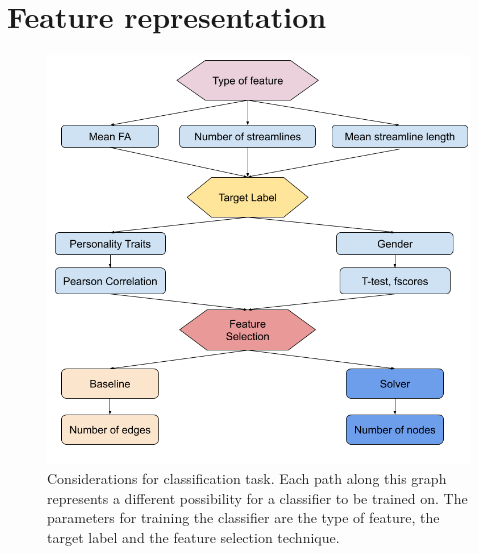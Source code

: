 \documentclass[msthesis.tex]{subfiles}
\begin{document}

\section{Feature representation}
\begin{figure}
    \centering
    \includegraphics[width=\textwidth]{images/Graph_clf_possibilites.png}
    \caption{Considerations for classification task. Each path along this graph represents a different possibility for a classifier to be trained on. The parameters for training the classifier are the type of feature, the target label and the feature selection technique.}
    \label{tab:classify_combo}
\end{figure}
\iffalse
\end{document}
